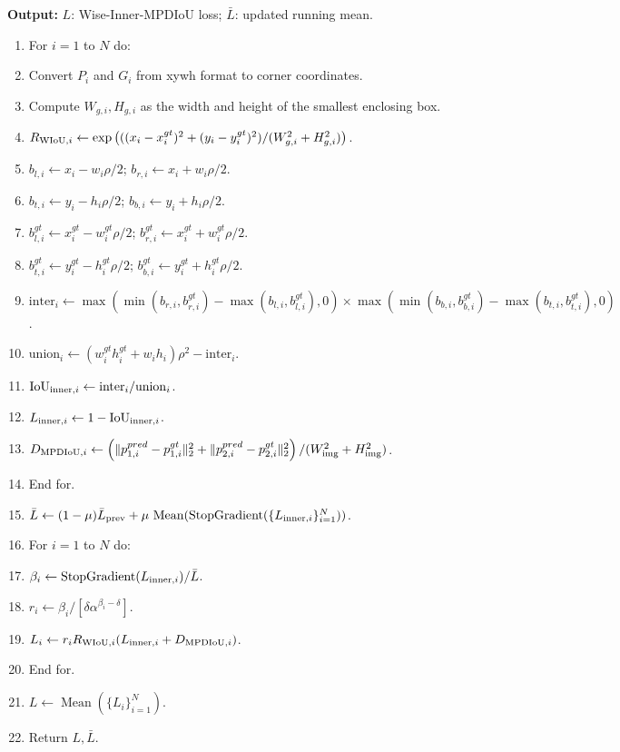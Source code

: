 \documentclass[10pt]{article}
\begin{document}
\textbf{Output:} $L$: Wise-Inner-MPDIoU loss; $\bar L$: updated running mean.

\begin{enumerate}[label=\arabic*:,leftmargin=2em,itemsep=3pt]
\item For $i=1$ to $N$ do:
\item Convert $P_i$ and $G_i$ from xywh format to corner coordinates.
\item Compute $W_{g,i},H_{g,i}$ as the width and height of the smallest enclosing box.
\item $R_{{\rm WIoU},i}\gets\exp\left(((x_i-x_i^{gt})^2+(y_i-y_i^{gt})^2)/(W_{g,i}^2+H_{g,i}^2)\right)$.
\item $b_{l,i}\gets x_i-w_i\rho/2$; $b_{r,i}\gets x_i+w_i\rho/2$.
\item $b_{t,i}\gets y_i-h_i\rho/2$; $b_{b,i}\gets y_i+h_i\rho/2$.
\item $b_{l,i}^{gt}\gets x_i^{gt}-w_i^{gt}\rho/2$; $b_{r,i}^{gt}\gets x_i^{gt}+w_i^{gt}\rho/2$.
\item $b_{t,i}^{gt}\gets y_i^{gt}-h_i^{gt}\rho/2$; $b_{b,i}^{gt}\gets y_i^{gt}+h_i^{gt}\rho/2$.
\item $\mathrm{inter}_i\gets\max(\min(b_{r,i},b_{r,i}^{gt})-\max(b_{l,i},b_{l,i}^{gt}),0)\times\max(\min(b_{b,i},b_{b,i}^{gt})-\max(b_{t,i},b_{t,i}^{gt}),0)$.
\item $\mathrm{union}_i\gets(w_i^{gt}h_i^{gt}+w_ih_i)\rho^2-\mathrm{inter}_i$.
\item $\mathrm{IoU}_{{\rm inner},i}\gets\mathrm{inter}_i/\mathrm{union}_i$.
\item $L_{{\rm inner},i}\gets1-\mathrm{IoU}_{{\rm inner},i}$.
\item $D_{{\rm MPDIoU},i}\gets\left(\|p_{1,i}^{pred}-p_{1,i}^{gt}\|_2^2+\|p_{2,i}^{pred}-p_{2,i}^{gt}\|_2^2\right)/(W_{\rm img}^2+H_{\rm img}^2)$.
\item End for.
\item $\bar L\gets(1-\mu)\bar L_{\rm prev}+\mu\,\operatorname{Mean}(\operatorname{StopGradient}(\{L_{{\rm inner},i}\}_{i=1}^N))$.
\item For $i=1$ to $N$ do:
\item $\beta_i\gets\operatorname{StopGradient}(L_{{\rm inner},i})/\bar L$.
\item $r_i\gets\beta_i/[\delta\alpha^{\beta_i-\delta}]$.
\item $L_i\gets r_iR_{{\rm WIoU},i}(L_{{\rm inner},i}+D_{{\rm MPDIoU},i})$.
\item End for.
\item $L\gets\operatorname{Mean}(\{L_i\}_{i=1}^N)$.
\item Return $L,\bar L$.
\end{enumerate}
\end{document}
